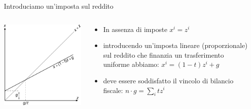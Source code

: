 \documentclass[11pt]{beamer}
\begin{document}
\begin{frame}{Introduciamo un'imposta sul reddito}
\begin{columns}
\begin{column}{.55\columnwidth}
\begin{center}
\includegraphics[width=\textwidth]{./figure/effetto-distorsivo-imposte-ql-2.pdf}
\end{center}
\end{column}


\begin{column}{.45\columnwidth}
\begin{itemize}
\item In assenza di imposte $x^i=z^i$
\item introducendo un'imposta lineare (proporzionale) sul reddito che finanzia un
trasferimento uniforme abbiamo: $x^i=(1-t)z^i+g$
\item deve essere soddisfatto il vincolo di bilancio fiscale: $n\cdot g=\sum_itz^i$
\end{itemize}
\end{column}
\end{columns}
\end{frame}
\end{document}
